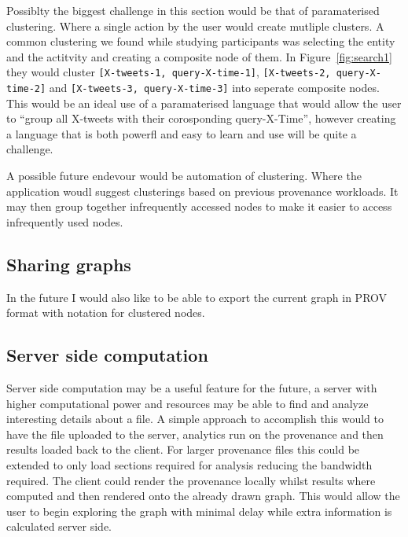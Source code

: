 Possiblty the biggest challenge in this section would be that of paramaterised clustering. Where a single action by the user would create mutliple clusters. A common clustering we found while studying participants was selecting the entity and the actitvity and creating a composite node of them. In Figure~\ref{fig:search1} they would cluster \texttt{[X-tweets-1, query-X-time-1]}, \texttt{[X-tweets-2, query-X-time-2]} and \texttt{[X-tweets-3, query-X-time-3]} into seperate composite nodes. This would be an ideal use of a paramaterised language that would allow the user to ``group all X-tweets with their corosponding query-X-Time'', however creating a language that is both powerfl and easy to learn and use will be quite a challenge.

A possible future endevour would be automation of clustering. Where the application woudl suggest clusterings based on previous provenance workloads. It may then group together infrequently accessed nodes to make it easier to access infrequently used nodes.

\subsection{Sharing graphs}
\label{sub:sharing_graphs}

In the future I would also like to be able to export the current graph in PROV format with notation for clustered nodes.

\subsection{Server side computation}
\label{sub:server_side_computation}

Server side computation may be a useful feature for the future, a server with higher computational power and resources may be able to find and analyze interesting details about a file. A simple approach to accomplish this would to have the file uploaded to the server, analytics run on the provenance and then results loaded back to the client. For larger provenance files this could be extended to only load sections required for analysis reducing the bandwidth required. The client could render the provenance locally whilst results where computed and then rendered onto the already drawn graph. This would allow the user to begin exploring the graph with minimal delay while extra information is calculated server side.

